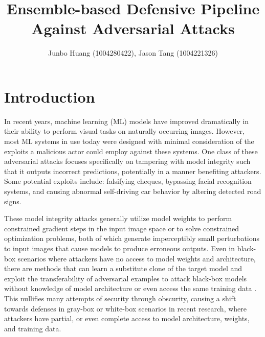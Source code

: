 \documentclass[10pt,journal,compsoc]{IEEEtran}
\title{Ensemble-based Defensive Pipeline Against Adversarial Attacks}
\author{Junbo Huang (1004280422), Jason Tang (1004221326)}
\begin{document}

\maketitle

\section{Introduction} %
In recent years, machine learning (ML) models have improved dramatically in their ability to perform visual tasks on naturally occurring images. However, most ML systems in use today were designed with minimal consideration of the exploits a malicious actor could employ against these systems. One class of these adversarial attacks focuses specifically on tampering with model integrity such that it outputs incorrect predictions, potentially in a manner benefiting attackers. Some potential exploits include: falsifying cheques, bypassing facial recognition systems, and causing abnormal self-driving car behavior by altering detected road signs. 

These model integrity attacks generally utilize model weights to perform constrained gradient steps in the input image space or to solve constrained optimization problems, both of which generate imperceptibly small perturbations to input images that cause models to produce erroneous outputs. Even in black-box scenarios where attackers have no access to model weights and architecture, there are methods that can learn a substitute clone of the target model and exploit the transferability of adversarial examples to attack black-box models without knowledge of model architecture or even access the same training data \cite{pbba}. This nullifies many attempts of security through obscurity, causing a shift towards defenses in gray-box or white-box scenarios in recent research, where attackers have partial, or even complete access to model architecture, weights, and training data. 
\end{document}

